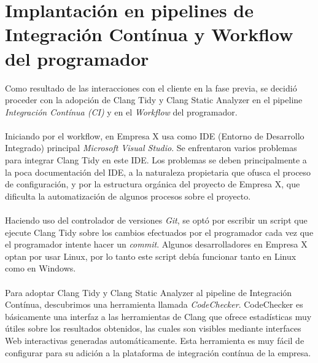\documentclass[12pt]{extreport} %
\begin{document}
\section{Implantación en pipelines de Integración Contínua y Workflow del programador}

Como resultado de las interacciones con el cliente en la fase previa,
se decidió proceder con la adopción de Clang Tidy y Clang Static
Analyzer en el pipeline \emph{Integración Contínua (CI)} y en el
\emph{Workflow} del programador.

\paragraph{}
Iniciando por el workflow, en Empresa X usa como IDE (Entorno de
Desarrollo Integrado) principal \emph{Microsoft Visual Studio}. Se
enfrentaron varios problemas para integrar Clang Tidy en este IDE.
Los problemas se deben principalmente a la poca documentación del IDE,
a la naturaleza propietaria que ofusca el proceso de configuración, y
por la estructura orgánica del proyecto de Empresa X, que dificulta la
automatización de algunos procesos sobre el proyecto.

\paragraph{}
Haciendo uso del controlador de versiones \emph{Git}, se optó por
escribir un script que ejecute Clang Tidy sobre los cambios efectuados
por el programador cada vez que el programador intente hacer un
\emph{commit}. Algunos desarrolladores en Empresa X optan por usar
Linux, por lo tanto este script debía funcionar tanto en Linux como en Windows.

\paragraph{}
Para adoptar Clang Tidy y Clang Static Analyzer al pipeline de
Integración Contínua, descubrimos una herramienta llamada
\emph{CodeChecker}. CodeChecker es básicamente una interfaz a las
herramientas de Clang que ofrece estadísticas muy útiles sobre los
resultados obtenidos, las cuales son visibles mediante interfaces Web
interactivas generadas automáticamente. Esta herramienta es muy fácil
de configurar para su adición a la plataforma de integración contínua
de la empresa.
\end{document}
